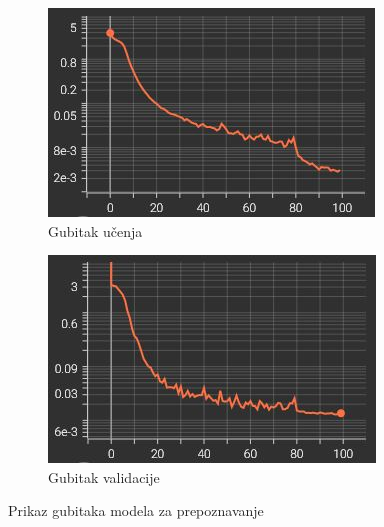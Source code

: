 \documentclass[times, utf8, diplomski]{fer}
\begin{document}
\begin{figure}[H]
     \centering
     \begin{subfigure}[b]{0.4\textwidth}
         \centering
         \includegraphics[width=\textwidth]{figures/results/recognizer_train.jpg}
         \caption{Gubitak učenja}
     \end{subfigure}
     \hspace{0.5cm}
     \begin{subfigure}[b]{0.4\textwidth}
         \centering
         \includegraphics[width=\textwidth]{figures/results/recognizer_val.jpg}
         \caption{Gubitak validacije}
     \end{subfigure}
    \caption{Prikaz gubitaka modela za prepoznavanje}
    \label{fig:loss_recognizer}
\end{figure}
\end{document}
